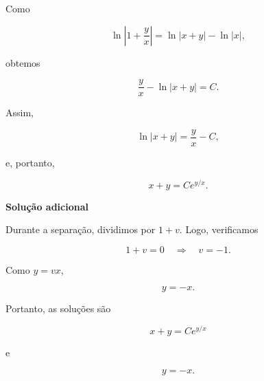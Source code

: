{Como

$$
  \ln\left|1+\frac{y}{x}\right|
  =
  \ln|x+y|-\ln|x|,
$$

obtemos

$$
  \frac{y}{x}-\ln|x+y|=C.
$$

Assim,

$$
  \ln|x+y|
  =
  \frac{y}{x}-C,
$$

e, portanto,

$$
  \boxed{x+y=Ce^{y/x}}.
$$

\textbf{Solução adicional}

Durante a separação, dividimos por $1+v$. Logo, verificamos

$$
  1+v=0
  \quad\Longrightarrow\quad
  v=-1.
$$

Como $y=vx$,

$$
  y=-x.
$$

Portanto, as soluções são

$$
 \boxed{x+y=Ce^{y/x}}
$$

e

$$
 \boxed{y=-x}.
$$

}




